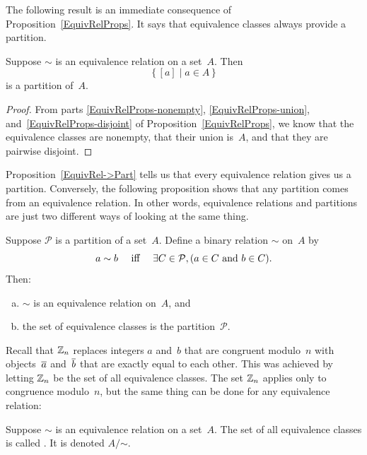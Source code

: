 The following result is an immediate consequence of Proposition~\ref{EquivRelProps}. It says that equivalence classes always provide a partition.

\begin{thm} \label{EquivRel->Part}
Suppose $\sim$ is an equivalence relation on a set~$A$. Then 
	$$ \{\, [a] \mid a \in A \,\} $$
is a partition of~$A$.
\end{thm}

\begin{proof}
From parts \ref{EquivRelProps-nonempty}, \ref{EquivRelProps-union}, and~\ref{EquivRelProps-disjoint} of Proposition~\ref{EquivRelProps}, we know that the equivalence classes are nonempty, that their union is~$A$, and that they are pairwise disjoint.
\end{proof}

Proposition~\ref{EquivRel->Part} tells us that every equivalence relation gives us a partition. Conversely, the following proposition shows that any partition comes from an equivalence relation. In other words, equivalence relations and partitions are just two different ways of looking at the same thing.

\begin{prop}\label{Part->EquivRel}
Suppose $\mathcal{P}$ is a partition of a set~$A$. Define a binary relation $\sim$ on~$A$ by
	$$ \text{$a \sim b$ \quad iff \quad $\exists C \in \mathcal{P}, ( \text{$a \in C$ and $b \in C$} )$} .$$
Then:
\begin{enumerate}[(a)]
\item \label{Part->EquivRel-equiv}
 $\sim$ is an equivalence relation on~$A$,
and
\item \label{Part->EquivRel-classes}
 the set of equivalence classes is the partition~$\mathcal{P}$.
\end{enumerate}
\end{prop}



Recall that $\mathbb{Z}_n$ replaces integers $a$ and~$b$ that are congruent modulo~$n$ with objects~$\overline{a}$ and~$\overline{b}$ that are exactly equal to each other. This was achieved by letting $\mathbb{Z}_n$ be the set of all equivalence classes. The set $\mathbb{Z}_n$ applies only to congruence modulo~$n$, but the same thing can be done for any equivalence relation:

\begin{defn}
Suppose $\sim$ is an equivalence relation on a set~$A$. The set of all equivalence classes is called . It is denoted $A/\mathord{\sim}$.
\end{defn}

